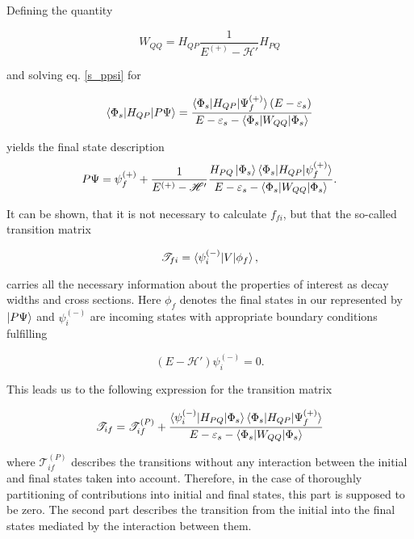 Defining the quantity

\begin{equation}
  W_{QQ} = H_{QP}\frac{1}{E^{(+)} - \mathscr{H}'}H_{PQ}
\end{equation}

and solving eq. \ref{s_ppsi} for

\begin{equation}
  \braket{\Phi_s|H_{QP}|P\Psi} = \frac{\braket{\Phi_s|H_{QP}|\Psi_f^{(+)}}(E-\varepsilon_s)}
{E - \varepsilon_s - \braket{\Phi_s|W_{QQ}|\Phi_s}}
\end{equation}

yields the final state description
\begin{equation}\label{}
  P \Psi = \psi_f^{(+)} + \frac{1}{E^{(+)} - \mathscr{H}'}
           \frac{H_{PQ}\ket{\Phi_s}
           \braket{\Phi_s|H_{QP}|\psi_f^{(+)}}}
           {E - \varepsilon_s - \braket{\Phi_s|W_{QQ}|\Phi_s}} .
\end{equation}

It can be shown, that it is not necessary to calculate $f_{fi}$, but that the
so-called transition matrix

\begin{equation}
  \mathscr{T}_{fi} = \braket{\psi_i^{(-)}|V|\phi_f},
\end{equation}

carries all the necessary information about the properties of interest as
decay widths and cross sections. \cite{Gell-Mann53}
Here $\phi_f$ denotes the final states in our represented by $\ket{P \Psi}$ and
$\psi_i^{(-)}$ are incoming states with appropriate boundary conditions fulfilling

\begin{equation}
  (E - \mathscr{H}') \psi_i^{(-)} = 0 .
\end{equation}

This leads us to the following expression for the transition matrix

\begin{equation}
  \mathscr{T}_{if} = \mathscr{T}_{if}^{(P)} + 
                     \frac{\braket{\psi_i^{(-)}|H_{PQ}|\Phi_s}
                           \braket{\Phi_s|H_{QP}|\Psi_f^{(+)}}}
                          {E-\varepsilon_s - \braket{\Phi_s|W_{QQ}|\Phi_s}}
\end{equation}

where $\mathscr{T}_{if}^{(P)}$ describes the transitions without any interaction
between the initial and final states taken into account. Therefore, in the case
of thoroughly partitioning of contributions into initial and final states,
this part is supposed to be zero. The second part describes the transition
from the initial into the final states mediated by the interaction between them.

